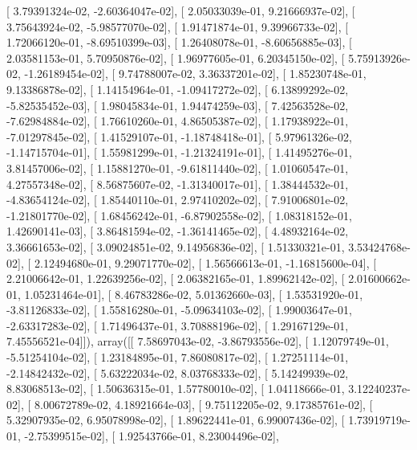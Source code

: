 \documentclass{article}
\begin{document}
       [  3.79391324e-02,  -2.60364047e-02],
       [  2.05033039e-01,   9.21666937e-02],
       [  3.75643924e-02,  -5.98577070e-02],
       [  1.91471874e-01,   9.39966733e-02],
       [  1.72066120e-01,  -8.69510399e-03],
       [  1.26408078e-01,  -8.60656885e-03],
       [  2.03581153e-01,   5.70950876e-02],
       [  1.96977605e-01,   6.20345150e-02],
       [  5.75913926e-02,  -1.26189454e-02],
       [  9.74788007e-02,   3.36337201e-02],
       [  1.85230748e-01,   9.13386878e-02],
       [  1.14154964e-01,  -1.09417272e-02],
       [  6.13899292e-02,  -5.82535452e-03],
       [  1.98045834e-01,   1.94474259e-03],
       [  7.42563528e-02,  -7.62984884e-02],
       [  1.76610260e-01,   4.86505387e-02],
       [  1.17938922e-01,  -7.01297845e-02],
       [  1.41529107e-01,  -1.18748418e-01],
       [  5.97961326e-02,  -1.14715704e-01],
       [  1.55981299e-01,  -1.21324191e-01],
       [  1.41495276e-01,   3.81457006e-02],
       [  1.15881270e-01,  -9.61811440e-02],
       [  1.01060547e-01,   4.27557348e-02],
       [  8.56875607e-02,  -1.31340017e-01],
       [  1.38444532e-01,  -4.83654124e-02],
       [  1.85440110e-01,   2.97410202e-02],
       [  7.91006801e-02,  -1.21801770e-02],
       [  1.68456242e-01,  -6.87902558e-02],
       [  1.08318152e-01,   1.42690141e-03],
       [  3.86481594e-02,  -1.36141465e-02],
       [  4.48932164e-02,   3.36661653e-02],
       [  3.09024851e-02,   9.14956836e-02],
       [  1.51330321e-01,   3.53424768e-02],
       [  2.12494680e-01,   9.29071770e-02],
       [  1.56566613e-01,  -1.16815600e-04],
       [  2.21006642e-01,   1.22639256e-02],
       [  2.06382165e-01,   1.89962142e-02],
       [  2.01600662e-01,   1.05231464e-01],
       [  8.46783286e-02,   5.01362660e-03],
       [  1.53531920e-01,  -3.81126833e-02],
       [  1.55816280e-01,  -5.09634103e-02],
       [  1.99003647e-01,  -2.63317283e-02],
       [  1.71496437e-01,   3.70888196e-02],
       [  1.29167129e-01,   7.45556521e-04]]), array([[  7.58697043e-02,  -3.86793556e-02],
       [  1.12079749e-01,  -5.51254104e-02],
       [  1.23184895e-01,   7.86080817e-02],
       [  1.27251114e-01,  -2.14842432e-02],
       [  5.63222034e-02,   8.03768333e-02],
       [  5.14249939e-02,   8.83068513e-02],
       [  1.50636315e-01,   1.57780010e-02],
       [  1.04118666e-01,   3.12240237e-02],
       [  8.00672789e-02,   4.18921664e-03],
       [  9.75112205e-02,   9.17385761e-02],
       [  5.32907935e-02,   6.95078998e-02],
       [  1.89622441e-01,   6.99007436e-02],
       [  1.73919719e-01,  -2.75399515e-02],
       [  1.92543766e-01,   8.23004496e-02],
\end{document}
